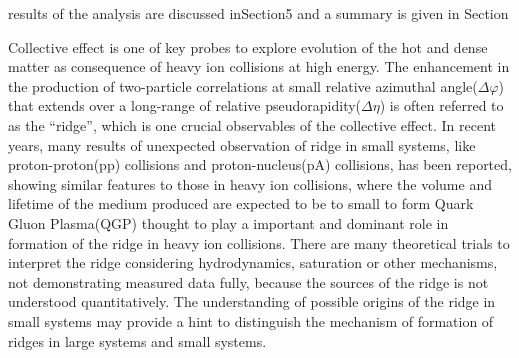 \documentclass[ALICE,manyauthors]{cernphprep}
\begin{document}
results of the analysis are discussed inSection5 and a summary is given in Section

Collective effect is one of key probes to explore evolution of the hot and dense matter as consequence of heavy ion collisions at high energy. The enhancement in the production of two-particle correlations at small relative azimuthal angle($\Delta\varphi$) that extends over a long-range of relative pseudorapidity($\Delta\eta$) is often referred to as the “ridge”, which is one crucial observables of the collective effect. In recent years, many results of unexpected observation of ridge in small systems, like proton-proton(pp) collisions and proton-nucleus(pA) collisions, has been reported, showing similar features to those in heavy ion collisions, where the volume and lifetime of the medium produced are expected to be to small to form Quark Gluon Plasma(QGP) thought to play a important and dominant role in formation of the ridge in heavy ion collisions. There are many theoretical trials to interpret the ridge considering hydrodynamics, saturation or other mechanisms, not demonstrating measured data fully, because the sources of the ridge is not understood quantitatively. The understanding of possible origins of the ridge in small systems may provide a hint to distinguish the mechanism of formation of ridges in large systems and small systems.

\end{document}
